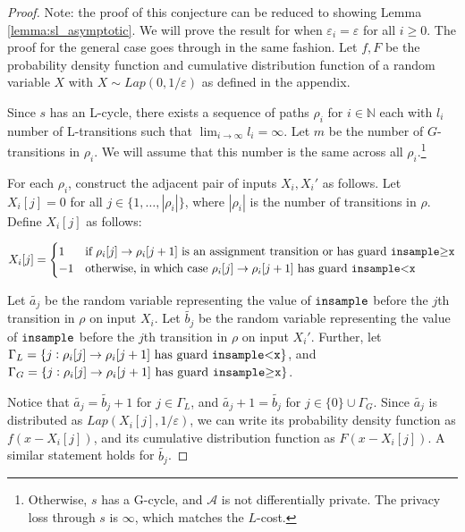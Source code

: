 \documentclass{article}
\newcommand{\N}{\mathbb{N}}
\renewcommand{\epsilon}{\varepsilon}
\newcommand{\insamplegeqx}{\textup{\texttt{insample$\geq$x}}}
\newcommand{\insampleltx}{\textup{\texttt{insample$<$x}}}
\newcommand{\insample}{\textup{\texttt{insample}}}
\newcommand{\1}{\langle 1 \rangle}
\newcommand{\2}{\langle 2 \rangle}
\begin{document}
\begin{proof}
    Note: the proof of this conjecture can be reduced to showing Lemma \ref{lemma:sl_asymptotic}.
    We will prove the result for when $\epsilon_i = \epsilon$ for all $i \geq 0$. The proof for the general case goes through in the same fashion. Let $f, F$ be the probability density function and cumulative distribution function of a random variable $X$ with $X \sim Lap(0, 1/\epsilon)$ as defined in the appendix. 

    Since $s$ has an L-cycle, there exists a sequence of paths $\rho_i$ for $i \in \N$ each with $l_i$ number of L-transitions such that $\lim_{i \to \infty} l_i = \infty$. Let $m$ be the number of $G$-transitions in $\rho_i$. We will assume that this number is the same across all $\rho_i$.\footnote{Otherwise, $s$ has a G-cycle, and $\mathcal{A}$ is not differentially private. The privacy loss through $s$ is $\infty$, which matches the $L$-cost.}
    
    For each $\rho_i$, construct the adjacent pair of inputs $X_i, X_i'$ as follows. Let $X_i[j] = 0$ for all $j \in \{1, \dots, |\rho_i|\}$, where $|\rho_i|$ is the number of transitions in $\rho$. Define $X_i[j]$ as follows:

    \[X_i[j] = \begin{cases}
        1 & \text{if } \rho_i[j] \to \rho_i[j + 1] \text{ is an assignment transition or has guard \insamplegeqx} \\
        -1 & \text{otherwise, in which case } \rho_i[j] \to \rho_i[j + 1] \text{ has guard \insampleltx}\\
    \end{cases}\]

    Let $\tilde{a_j}$ be the random variable representing the value of $\insample$ before the $j$th transition in $\rho$ on input $X_i$. Let $\tilde{b_j}$ be the random variable representing the value of $\insample$ before the $j$th transition in $\rho$ on input $X_i'$. Further, let $\Gamma_L = \{j : \rho_i[j] \to \rho_i[j + 1] \text{ has guard } \insampleltx\}$, and $\Gamma_G = \{j : \rho_i[j] \to \rho_i[j + 1] \text{ has guard } \insamplegeqx\}$. 
    
    Notice that $\tilde{a_j} = \tilde{b_j} + 1$ for $j \in \Gamma_L$, and $\tilde{a_j} + 1 = \tilde{b_j}$ for $j \in \{0\} \cup \Gamma_G$. Since $\tilde{a_j}$ is distributed as $Lap(X_i[j], 1/\epsilon)$, we can write its probability density function as $f(x - X_i[j])$, and its cumulative distribution function as $F(x - X_i[j])$. A similar statement holds for $\tilde{b_j}$.
    

\end{proof}
\end{document}
